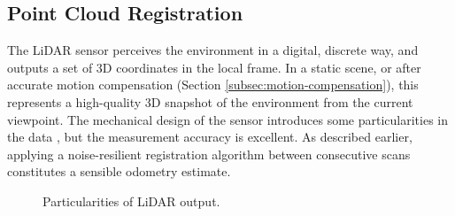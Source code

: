 \subsection{Point Cloud Registration}
\label{subsec:registration}

The LiDAR sensor perceives the environment in a digital, discrete way, and outputs a set of 3D coordinates in the local frame. In a static scene, or after accurate motion compensation (Section \ref{subsec:motion-compensation}), this represents a high-quality 3D snapshot of the environment from the current viewpoint. The mechanical design of the sensor introduces some particularities in the data , but the measurement accuracy is excellent. As described earlier, applying a noise-resilient registration algorithm between consecutive scans constitutes a sensible odometry estimate.

\begin{figure}
	\centering
	\hfill
	\caption[Particularities of LiDAR output]{Particularities of LiDAR output.}
	\label{fig:pcd-effects}
\end{figure}

